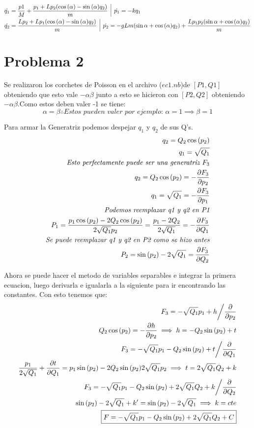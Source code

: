 \documentclass[12pt]{article}
\newcommand{\s}[1]{\section{#1}}
\newcommand{\coss}[1]{\cos{\qty(#1)}}
\newcommand{\sinn}[1]{\sin{\qty(#1)}}
\newcommand{\vl}{\,\,\, \vline \,\,\,}
\begin{document}
\begin{align}
&\dot{q_1}=	\frac{p1}{M}+ \frac{p_1+L p_2 \qty(\coss{\alpha}-\sinn{\alpha}q_2)}{m}\vl \dot{p_1}=-kq_1\\
&\dot{q_2}= \frac{Lp_2+ L p_1 \qty(\coss{\alpha}-\sinn{\alpha}q_2)}{m}\vl \dot{p_2}= -gLm\qty(\sin{\alpha}+\coss{\alpha}q_2)+\frac{Lp_1 p_2 \qty(\sin{\alpha}+\coss{\alpha}q_2)}{m}
\end{align}
\s{Problema 2}
Se realizaron los corchetes de Poisson en el archivo ($ec1.nb$)de $[P1,Q1]$ obteniendo que esto vale $-\alpha \beta$ junto a esto se hicieron con  $[P2,Q2]$ obteniendo $-\alpha \beta $.Como estos deben valer -1 se tiene:\\
$$\alpha =  \beta \therefore \textit{Estos pueden valer por ejemplo: } \alpha = 1 \implies \beta = 1$$

Para armar la Generatriz podemos despejar $q_1$ y $q_2$ de sus Q's.
\begin{align}
q_2=Q_2 \coss{p_2}\\
q_1=\sqrt{Q_1}\\
\textit{Esto perfectamente puede ser una generatriz }F_3\\
q_2=Q_2 \coss{p_2}=-\pdv{F_3}{p_2}\\
q_1=\sqrt{Q_1}=-\pdv{F_3}{p_1}\\
\textit{Podemos reemplazar q1 y q2 en P1}\\
P_1= \frac{p_1 \coss{p_2} -2Q_2 \coss{p_2}}{2\sqrt{Q_1}p_2}=\frac{p_1 -2 Q_2}{2\sqrt{Q_1}}=-\pdv{F_3}{Q_1}\\
\textit{Se puede reemplazar q1 y q2 en P2 como se hizo antes}\\
P_2=\sinn{p_2}-2\sqrt{Q_1}=\pdv{F_3}{Q_2}
\end{align}

Ahora se puede hacer el metodo de variables separables e integrar la primera ecuacion, luego derivarla e igualarla a la siguiente para ir encontrando las constantes. Con esto tenemos que:
\begin{align}
F_3=-\sqrt{Q_1}p_1+h \bigg/ \pdv{p_2}\\
Q_2 \coss{p_2}=-\pdv{h}{p_2}\implies h= -Q_2 \sinn{p_2}+t\\
F_3=-\sqrt{Q_1}p_1 -Q_2 \sinn{p_2}+t\bigg/ \pdv{Q_1}\\
\frac{p_1}{2\sqrt{Q_1}} +\pdv{t}{Q_1}=p_1 \sinn{p_2} -2Q_2 \sinn{p_2}{2\sqrt{Q_1}p_2} \implies t=2\sqrt{Q_1}Q_2 + k\\
F_3=-\sqrt{Q_1}p_1 -Q_2 \sinn{p_2} + 2\sqrt{Q_1}Q_2 + k\bigg/ \pdv{Q_2}\\
\sinn{p_2}-2\sqrt{Q_1} +k'=\sinn{p_2}-2\sqrt{Q_1} \implies k=cte\\
\boxed{F=-\sqrt{Q_1}p_1 -Q_2 \sinn{p_2} + 2\sqrt{Q_1}Q_2 + C}
\end{align}
\end{document}
